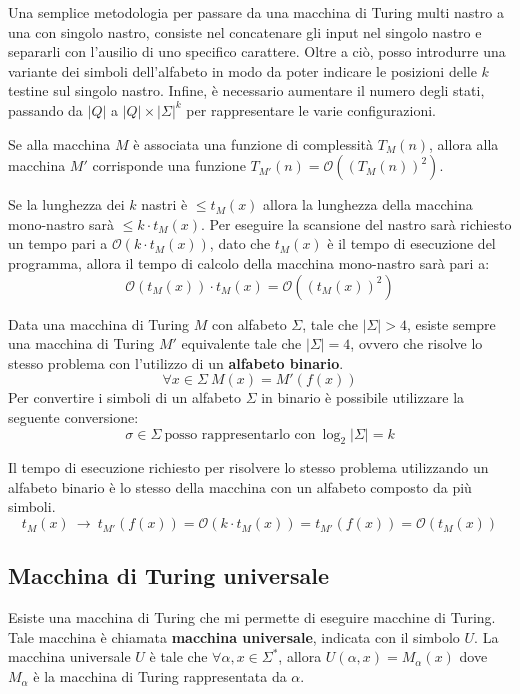 Una semplice metodologia per passare da una macchina di Turing multi nastro a una 
con singolo nastro, consiste nel concatenare gli input nel singolo nastro e separarli 
con l'ausilio di uno specifico carattere. Oltre a ciò, posso introdurre una variante
 dei simboli dell'alfabeto in modo da poter indicare le posizioni delle $k$ testine
  sul singolo nastro. Infine, è necessario aumentare il numero degli stati, passando 
  da $|Q|$ a $|Q| \times |\Sigma|^k$ per rappresentare le varie configurazioni.
\begin{teorema}
    Se alla macchina $M$ è associata una funzione di complessità $T_M(n)$, allora 
    alla macchina $M'$ corrisponde una funzione $T_{M'}(n) = \mathcal{O}((T_M(n))^2)$.
\end{teorema}

Se la lunghezza dei $k$ nastri è $\leq t_M(x)$ allora la lunghezza della macchina
 mono-nastro sarà $\leq k \cdot t_M(x)$. Per eseguire la scansione del nastro sarà 
 richiesto un tempo pari a $\mathcal{O}(k \cdot t_M(x))$, dato che $t_M(x)$ è il
  tempo di esecuzione del programma, allora il tempo di calcolo della macchina 
  mono-nastro sarà pari a: 
\begin{equation}
    \mathcal{O}(t_M(x)) \cdot t_M(x) = \mathcal{O}((t_M(x))^2)
\end{equation}

Data una macchina di Turing $M$ con alfabeto $\Sigma$, tale che $|\Sigma| > 4$, 
esiste sempre una macchina di Turing $M'$ equivalente tale che $|\Sigma| = 4$, ovvero 
che risolve lo stesso problema con l'utilizzo di un \textbf{alfabeto binario}.
\begin{equation}
    \forall x \in \Sigma \ M(x) = M'(f(x))
\end{equation}
Per convertire i simboli di un alfabeto $\Sigma$ in binario è possibile utilizzare 
la seguente conversione:
\begin{equation}
    \sigma \in \Sigma \ \text{posso rappresentarlo con} \ \log_{2}|\Sigma | = k
\end{equation}

Il tempo di esecuzione richiesto per risolvere lo stesso problema utilizzando un 
alfabeto binario è lo stesso della macchina con un alfabeto composto da più simboli.
\begin{equation}
    t_M(x) \ \to \ t_{M'}(f(x)) = \mathcal{O}(k \cdot t_M(x)) = t_{M'}(f(x)) = \mathcal{O}(t_M(x))
\end{equation}
\subsection{Macchina di Turing universale}
Esiste una macchina di Turing che mi permette di eseguire macchine di Turing. Tale macchina 
è chiamata \textbf{macchina universale}, indicata con il simbolo $U$. La macchina
 universale $U$ è tale che $\forall \alpha, x \in \Sigma^{\ast}$, allora 
 $U(\alpha, x) = M_{\alpha}(x)$ dove $M_{\alpha}$ è la macchina di Turing rappresentata da $\alpha$.

